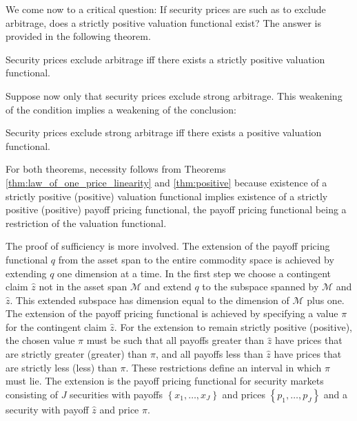 \documentclass[\topdir/lecture\_notes.tex]{subfiles}
\begin{document}
We come now to a critical question: If security prices are such as to exclude arbitrage, does a strictly positive valuation functional exist? The answer is provided in the following theorem.

\begin{theorem}\label{thm:fundamental_theorem_finance}
Security prices exclude arbitrage iff there exists a strictly positive valuation functional.
\end{theorem}
Suppose now only that security prices exclude strong arbitrage. This weakening of the condition implies a weakening of the conclusion:

\begin{theorem}\label{thm:fundamental_theorem_finance_weak}
Security prices exclude strong arbitrage iff there exists a positive valuation functional.
\end{theorem}

For both theorems, necessity follows from Theorems \ref{thm:law_of_one_price_linearity} and \ref{thm:positive} because existence of a strictly positive (positive) valuation functional implies existence of a strictly positive (positive) payoff pricing functional, the payoff pricing functional being a restriction of the valuation functional. 

The proof of sufficiency is more involved. The extension of the payoff pricing functional $q$ from the asset span to the entire commodity space is achieved by extending $q$ one dimension at a time. In the first step we choose a contingent claim $\hat{z}$ not in the asset span $\mathcal{M}$ and extend $q$ to the subspace spanned by $\mathcal{M}$ and $\hat{z}$. This extended subspace has dimension equal to the dimension of $\mathcal{M}$ plus one. The extension of the payoff pricing functional is achieved by specifying a value $\pi$ for the contingent claim $\hat{z}$. For the extension to remain strictly positive (positive), the chosen value $\pi$ must be such that all payoffs greater than $\hat{z}$ have prices that are strictly greater (greater) than $\pi$, and all payoffs less than $\hat{z}$ have prices that are strictly less (less) than $\pi$. These restrictions define an interval in which $\pi$ must lie. The extension is the payoff pricing functional for security markets consisting of $J$ securities with payoffs $\left\{x_{1}, \ldots, x_{J}\right\}$ and prices $\left\{p_{1}, \ldots, p_{J}\right\}$ and a security with payoff $\hat{z}$ and price $\pi$.
\end{document}
